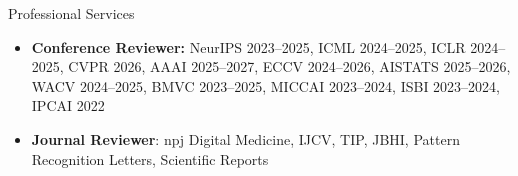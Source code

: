 \documentclass[a4paper]{resume} %
\begin{document}
\begin{rSection}{Professional Services}

\begin{itemize}

\item {\bf Conference Reviewer:} NeurIPS 2023--2025, ICML 2024--2025, ICLR 2024--2025,  CVPR 2026,  AAAI 2025--2027, ECCV 2024--2026, AISTATS 2025--2026, WACV 2024--2025, BMVC 2023--2025, MICCAI 2023--2024, ISBI 2023--2024, IPCAI 2022
\item {\bf Journal Reviewer}: npj Digital Medicine, IJCV, TIP, JBHI, Pattern Recognition Letters, Scientific Reports

\end{itemize}



\end{rSection}
\end{document}

